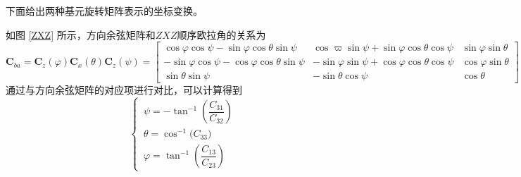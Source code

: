 下面给出两种基元旋转矩阵表示的坐标变换。
\vspace*{0.5em}


如图 \ref{ZXZ} 所示，方向余弦矩阵和$ZXZ$顺序欧拉角的关系为
\begin{equation}
	\bm{C}_{ba} = \bm{C}_z(\varphi) \bm{C}_x(\theta) \bm{C}_z(\psi) = 
	\begin{bmatrix}
		\cos \varphi \cos \psi - \sin \varphi \cos \theta \sin \psi & \cos \varpi \sin \psi + \sin \varphi \cos \theta \cos \psi & \sin \varphi \sin \theta \\
		- \sin \varphi \cos \psi - \cos \varphi \cos \theta \sin \psi & -\sin \varphi \sin \psi + \cos \varphi \cos \theta \cos \psi & \cos \varphi \sin \theta \\
		\sin \theta \sin \psi & -\sin \theta \cos \psi & \cos \theta 
	\end{bmatrix}
\end{equation}
通过与方向余弦矩阵的对应项进行对比，可以计算得到
\begin{equation}
	\begin{cases}
		\, \psi = -\tan^{-1}\left( \dfrac{C_{31}}{C_{32}} \right) \\
		\, \theta = \cos^{-1}\big( C_{33} \big) \\
		\, \varphi = \tan^{-1} \left( \dfrac{C_{13}}{C_{23}} \right)
	\end{cases}
	\label{eq:zxz}
\end{equation}
\clearpage

